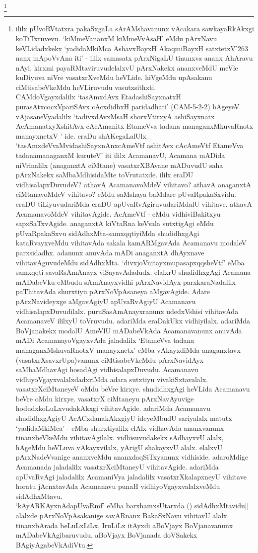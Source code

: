 \begin{shl}
\footnote{ililx pUvoRVtatxra pakaSxgaLa sArAMshavanunx vAcakara sawkayaRkAkxgi koTiTxruvevu. `kiMmeVananxM kiMmeVvAsaH' eMdu pArxNavu keVLidadxkekx `yadidaMkiMca AshavxBayxH AkaqmiBayxH satxtetxV\char'263 nanx mApoVvAna iti' - ililx samasatx pArxNigaLU tinunxva ananx AhAravu nAyi, kirxmi payaRMtaviruvudelalxvU pArxNakekx ananxveMdU meVle kuDiyuva niVre vasatxrXveMdu heVLide. hiVgeMdu upAsakanu ciMtisabeVkeMdu heVLiruvudu vasutxsithxti.\\
CAMdoVgayxdalilx `tasAmxdAvx EtadashiSayxnatxH purasAtxcocxVpariSAvx cAcxdidhxH paridadhati' (CAM-5-2-2) hAgeyeV vAjasaneVyadalilx `tadivxdAvxMsaH shorxVtirxyA ashiSayxnatx AcAmanatxyXshitAvx cAcAmanitx EtameVva tadana managanxMkuvaRnotx manayxnetxV ' ide. eraDu shAKegaLalUlx `tasAmxdeVvaMvidashiSayxnAnxcAmeVtf ashitAvx cAcAmeVtf EtameVva tadanamanaganxM kuruteV' iti ililx AcamanavU, Acamana mADida niVrinalilx (anaganxtA ciMtane) vasatxrXBAvane mADuvudU saha pArxNakekx saMbaMdhisidaMte toVrutatxde. ililx eraDU vidhisalapxDuvudeV? athavA AcamanavoMdeV vihitavo? athavA anaganxtA ciMtanavoMdeV vihitavo? eMdu saMshaya baMdare pUvaRpakaSxvidu. eraDU tiLiyuvudariMda eraDU apUvaRvAgiruvudariMdalU vihitave. athavA AcamanavoMdeV vihitavAgide. AcAmeVtf - eMdu vidhiviBakitxyu sapxSaTxvAgide. anaganxtA kiVtaRna keVvala sutxtigAgi eMdu pUvaRpakaSxvu sidAdhxMta-samxqqtiyiMda shudidhxgAgi kataRvayxveMdu vihitavAda sakala kamARMgavAda Acamanavu modaleV parxsidadhx. adanunx anuvAda mADi anaganxtA dhAyxnave vihitavAguvudeMdu sidAdhxMta. `divxjoVnitayxmupasapxqqsheVtf' eMba samxqqti savaRsAmAnayx viSayavAdadudx. elalxrU shudidhxgAgi Acamana mADabeVku eMbudu sAmAnayxvidhi pArxNavidAyx parxkaraNadalilx paThitavAda shurxtiyu pArxNoVpAsaneya aMgavAgide. Adare pArxNavideyxge aMgavAgiyU apUvaRvAgiyU Acamanavu vidhisalapxDuvudilalx. puruSasAmAnayxranunx udedxVshisi vihitavAda AcamanaveV ililxyU toVruvudu. adariMda eraDakUkx vidhiyilalx. adariMda BoVjanakekx modalU AmeVlU mADabeVkAda Acamanavanunx anuvAda mADi AcamanayoVgayxvAda jaladalilx `EtameVva tadana managanxMshuvaRnotxV manayxnetx' eMba vAkayxdiMda anaganxtavx (vasatxrXsavxrUpa)vanunx ciMtisabeVkeMdu pArxNavidAyx saMbaMdhavAgi hosadAgi vidhisalapxDuvudu. Acamanavu vidhiyoVgayxvalalxdadxriMda adara sutxtiyu vivakiSxtavalalx. vasatxrXciMtaneyeV oMdu beVre kirxye. shudidhxgAgi heVLida Acamanavu beVre oMdu kirxye. vasatxrX ciMtaneyu pArxNavAyuvige hodudxkoLuLxvudakAkxgi vihitavAgide. adariMda Acamanavu shudidhxgAgiyU AcACxdanakAkxgiyU ideyeMbudU sariyalalx matutx `yadidaMkiMca' - eMba shurxtiyalilx elAlx vidhavAda ananxvanunx tinanxbeVkeMdu vihitavAgilalx. vidhisuvudakekx sAdhayxvU alalx, hAgeMdu heVLuva vAkayxvilalx, yArigU shakayxvU alalx. elalxvU pArxNadeVvanige ananxveMdu ananxdaqSiTxyanunx vidhiside. adaroMdige Acamanada jaladalilx vasatxrXciMtaneyU vihitavAgide. adariMda apUvaRvAgi jaladalilx AcamaniVya jaladalilx vasatxrXkalapxneyU vihitave horatu jAcnxtavAda Acamanavu punaH vidhiyoVgayxvalalxveMdu sidAdhxMtavu.\\`kAyARKAyxnAdapUvaRmf' eMba barxhamxsUtarxda () sidAdhxMtavidu|| alalxde pArxNoVpAsakanige savARnanx BakaSxNavu vihitavU alalx. tinanxbArada beLuLxLiLx, IruLiLx itAyxdi aBoVjayx BoVjanavanunx mADabeVkAgibaruvudu. aBoVjayx BoVjanada doVSakekx BAgiyAgabeVkAdiVtu. }
\end{shl}
